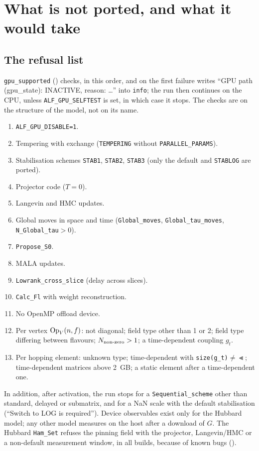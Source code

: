 \section{What is not ported, and what it would take}
\label{sec:notported}

\subsection{The refusal list}

\texttt{gpu\_supported} () checks, in this order, and on the first failure writes ``GPU path (gpu\_state): INACTIVE, reason: \ldots'' into \texttt{info}; the run then continues on the CPU, unless \texttt{ALF\_GPU\_SELFTEST} is set, in which case it stops. The checks are on the structure of the model, not on its name.

\begin{enumerate}
\item \texttt{ALF\_GPU\_DISABLE=1}.
\item Tempering with exchange (\texttt{TEMPERING} without \texttt{PARALLEL\_PARAMS}).
\item Stabilisation schemes \texttt{STAB1}, \texttt{STAB2}, \texttt{STAB3} (only the default and \texttt{STABLOG} are ported).
\item Projector code ($T=0$).
\item Langevin and HMC updates.
\item Global moves in space and time (\texttt{Global\_moves}, \texttt{Global\_tau\_moves}, \texttt{N\_Global\_tau}$>0$).
\item \texttt{Propose\_S0}.
\item MALA updates.
\item \texttt{Lowrank\_cross\_slice} (delay across slices).
\item \texttt{Calc\_Fl} with weight reconstruction.
\item No OpenMP offload device.
\item Per vertex $\mathrm{Op}_V(n,f)$: not diagonal; field type other than 1 or 2; field type differing between flavours; $N_{\rm non\text{-}zero}>1$; a time-dependent coupling $g_t$.
\item Per hopping element: unknown type; time-dependent with \texttt{size(g\_t)}$\ne\Lt$; time-dependent matrices above 2~GB; a static element after a time-dependent one.
\end{enumerate}
In addition, after activation, the run stops for a \texttt{Sequential\_scheme} other than standard, delayed or submatrix, and for a NaN scale with the default stabilisation (``Switch to LOG is required''). Device observables exist only for the Hubbard model; any other model measures on the host after a download of $G$. The Hubbard \texttt{Ham\_Set} refuses the pinning field with the projector, Langevin/HMC or a non-default measurement window, in all builds, because of known bugs ().

